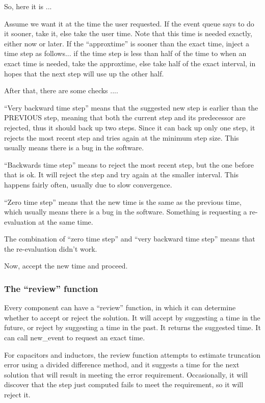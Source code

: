 So, here it is ...

Assume we want it at the time the user requested.  If the event queue
says to do it sooner, take it, else take the user time.  Note that
this time is needed exactly, either now or later.  If the
``approxtime'' is sooner than the exact time, inject a time step as
follows...  if the time step is less than half of the time to when an
exact time is needed, take the approxtime, else take half of the
exact interval, in hopes that the next step will use up the other
half.

After that, there are some checks ....

``Very backward time step'' means that the suggested new step is
earlier than the PREVIOUS step, meaning that both the current step and
its predecessor are rejected, thus it should back up two steps.  Since
it can back up only one step, it rejects the most recent step and
tries again at the minimum step size.  This usually means there is a
bug in the software.

``Backwards time step'' means to reject the most recent step, but the
one before that is ok.  It will reject the step and try again at the
smaller interval.  This happens fairly often, usually due to slow
convergence.

``Zero time step'' means that the new time is the same as the previous
time, which usually means there is a bug in the software.  Something
is requesting a re-evaluation at the same time.

The combination of ``zero time step'' and ``very backward time step''
means that the re-evaluation didn't work.

Now, accept the new time and proceed.

\subsubsection{The ``review'' function}

Every component can have a ``review'' function, in which it can
determine whether to accept or reject the solution.  It will accept by
suggesting a time in the future, or reject by suggesting a time in the
past.  It returns the suggested time.  It can call new\_event to
request an exact time.

For capacitors and inductors, the review function attempts to estimate
truncation error using a divided difference method, and it suggests a
time for the next solution that will result in meeting the error
requirement.  Occasionally, it will discover that the step just
computed fails to meet the requirement, so it will reject it.

